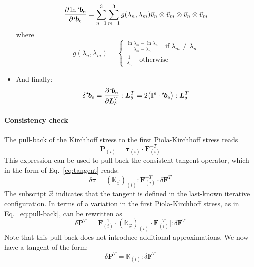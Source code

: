 \documentclass[garamond]{goose-article}
\newcommand\ST[1]{\hspace*{-.3em}~^\star\!#1}
\newcommand\T[1]{\bm{{#1}}}
\newcommand\TT[1]{\mathbb{{#1}}}
\begin{document}
\begin{itemize}
  \begin{equation}
    \frac{\partial \ln \ST{\T{b}}_\mathrm{e}}{\partial \ST{\T{b}}_\mathrm{e}} = \sum\limits_{n=1}^3 \sum\limits_{m=1}^3 g(\lambda_n, \lambda_m) \vec{v}_n \otimes \vec{v}_m \otimes \vec{v}_n \otimes \vec{v}_m
  \end{equation}
  where
  \begin{equation}
    g(\lambda_n, \lambda_m) =
    \begin{cases}
      \displaystyle \frac{\ln \lambda_m - \ln \lambda_n}{\lambda_m - \lambda_n} \quad\mathrm{if}\; \lambda_m \neq \lambda_n \\
      \displaystyle \frac{1}{\lambda_n} \quad\mathrm{otherwise}
    \end{cases}
  \end{equation}
  \item And finally:
  \begin{equation}
    \delta \ST{\T{b}}_\mathrm{e} = \frac{\partial \ST{\T{b}}_\mathrm{e}}{\partial \T{L}_\delta^T} : \T{L}_\delta^T = 2 \big( \TT{I}^s \cdot \ST{\T{b}}_\mathrm{e} \big) : \T{L}_\delta^T
  \end{equation}
\end{itemize}





\paragraph{Consistency check}

The pull-back of the Kirchhoff stress to the first Piola-Kirchhoff stress reads
\begin{equation}
  \T{P}_{(i)} = \bm{\tau}_{(i)} \cdot \T{F}^{-T}_{(i)}
\end{equation}
This expression can be used to pull-back the consistent tangent operator, which in the form of Eq.~\eqref{eq:tangent} reads:
\begin{equation}
  \delta \bm{\tau}
  =
  (\TT{K}_{\vec{x}})_{(i)}
  : \T{F}_{(i)}^{-T} \cdot \delta \T{F}^T
  \label{eq:pull-back}
\end{equation}
%
The subscript $\vec{x}$ indicates that the tangent is defined in the last-known iterative configuration. In terms of a variation in the first Piola-Kirchhoff stress, as in Eq.~\eqref{eq:pull-back}, can be rewritten as
%
\begin{equation}
  \delta \T{P}^T
  =
  \big[
  \T{F}_{(i)}^{-1} \cdot
  (\TT{K}_{\vec{x}})_{(i)}
  \cdot \T{F}_{(i)}^{-T}
  \big]
  : \delta \T{F}^T
\end{equation}
%
Note that this pull-back does not introduce additional approximations. We now have a tangent of the form:
\begin{equation}
  \delta \T{P}^T = \TT{K}_{(i)} : \delta \T{F}^T
  \label{eq:tangent:ref}
\end{equation}
\end{document}
